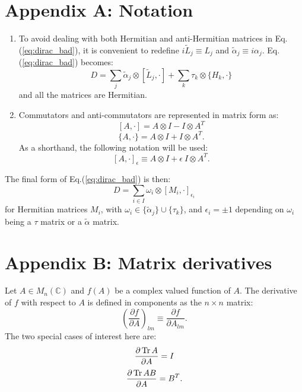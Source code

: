 \section*{Appendix A: Notation}
\begin{enumerate}
\item To avoid dealing with both Hermitian and anti-Hermitian matrices in Eq.(\ref{eq:dirac_bad}), it is convenient to redefine $i \tilde{L}_j \equiv L_j$ and $\tilde{\alpha}_j \equiv i \alpha_j$. Eq.(\ref{eq:dirac_bad}) becomes:
\begin{equation}
D = \sum_j \tilde{\alpha}_j \otimes [\tilde{L}_j, \cdot ] + \sum_k \tau_k \otimes \{H_k, \cdot \}
\end{equation}
and all the matrices are Hermitian.
\item Commutators and anti-commutators are represented in matrix form as:
$$[A, \cdot ] = A \otimes I - I \otimes A^T$$
$$\{A, \cdot \} = A \otimes I + I \otimes A^T.$$
As a shorthand, the following notation will be used:
\begin{equation}\label{eq:acomm}
[A, \cdot ]_{\epsilon} \equiv A \otimes I + \epsilon \ I \otimes A^T.
\end{equation}
\end{enumerate}
The final form of Eq.(\ref{eq:dirac_bad}) is then:
\begin{equation}\label{eq:dirac}
D = \sum_{i \in I} \omega_i \otimes [ M_i, \cdot ]_{\epsilon_i}
\end{equation}
for Hermitian matrices $M_i$, with $\omega_i \in \{ \tilde{\alpha}_j \} \cup \{ \tau_k \}$, and $\epsilon_i = \pm 1$ depending on $\omega_i$ being a $\tau$ matrix or a $\tilde{\alpha}$ matrix.

\section*{Appendix B: Matrix derivatives} \label{sec:matder}
Let $A \in M_n(\mathbb{C})$ and $f(A)$ be a complex valued function of $A$. The derivative of $f$ with respect to $A$ is defined in components as the $n \times n$ matrix:
\begin{equation}
\left(\frac{\partial f}{\partial A}\right)_{lm} \equiv \frac{\partial f}{\partial A_{lm}}.
\end{equation}
The two special cases of interest here are:
\begin{equation}
\frac{\partial \operatorname{Tr} A}{\partial A} = I
\end{equation}
\begin{equation}
\frac{\partial \operatorname{Tr} AB}{\partial A} = B^T.
\end{equation}

